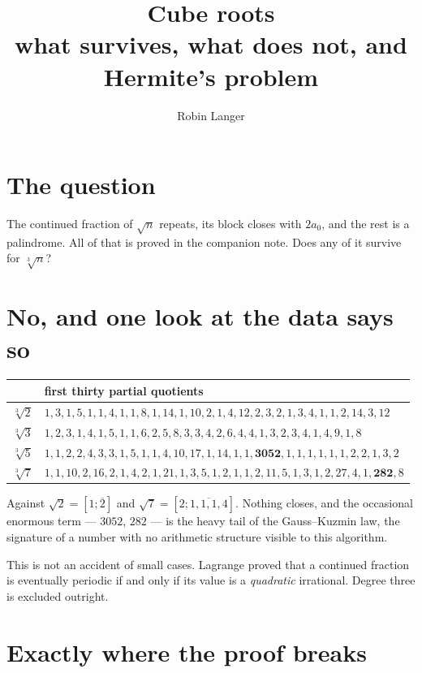 \documentclass[12pt,a4paper]{article}
\title{Cube roots\\[0.4em]\large what survives, what does not, and Hermite's problem}
\author{Robin Langer}
\date{}
\theoremstyle{plain}
\theoremstyle{definition}
\begin{document}
\maketitle
\vspace{-1.5em}

\section{The question}

The continued fraction of $\sqrt n$ repeats, its block closes with $2a_0$, and the rest is a palindrome. All of that is proved in the companion note. Does any of it survive for $\sqrt[3]{n}$?

\section{No, and one look at the data says so}

\begin{center}
\begin{tabular}{ll}
\toprule
 & first thirty partial quotients \\
\midrule
$\sqrt[3]{2}$ & $1,3,1,5,1,1,4,1,1,8,1,14,1,10,2,1,4,12,2,3,2,1,3,4,1,1,2,14,3,12$ \\
$\sqrt[3]{3}$ & $1,2,3,1,4,1,5,1,1,6,2,5,8,3,3,4,2,6,4,4,1,3,2,3,4,1,4,9,1,8$ \\
$\sqrt[3]{5}$ & $1,1,2,2,4,3,3,1,5,1,1,4,10,17,1,14,1,1,\mathbf{3052},1,1,1,1,1,1,2,2,1,3,2$ \\
$\sqrt[3]{7}$ & $1,1,10,2,16,2,1,4,2,1,21,1,3,5,1,2,1,1,2,11,5,1,3,1,2,27,4,1,\mathbf{282},8$ \\
\bottomrule
\end{tabular}
\end{center}

Against $\sqrt 2 = [1;\overline{2}]$ and $\sqrt 7 = [2;\overline{1,1,1,4}]$. Nothing closes, and the occasional enormous term --- $3052$, $282$ --- is the heavy tail of the Gauss--Kuzmin law, the signature of a number with no arithmetic structure visible to this algorithm.

This is not an accident of small cases. Lagrange proved that a continued fraction is eventually periodic if and only if its value is a \emph{quadratic} irrational. Degree three is excluded outright.

\section{Exactly where the proof breaks}
\end{document}
